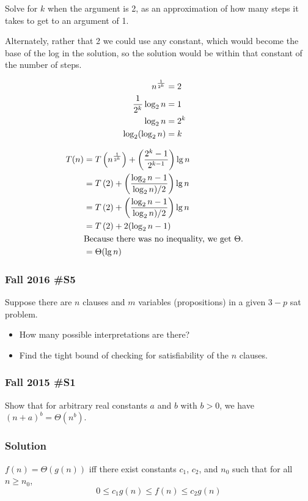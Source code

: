 \begin{enumerate}
Solve for $k$ when the argument is 2, as an approximation of how many steps it takes to get to an argument of 1.  

Alternately, rather that 2 we could use any constant, which would become the base of the log in the solution, so the solution would be within that constant of the number of steps.  

\begin{align*}
	n^\frac{1}{2^k} &= 2 \cr
	\frac{1}{2^k} \log_2 n &= 1 \cr
	\log_2 n &= 2^k \cr
	\log_2 (\log_2 n) &= k \cr
\end{align*}	

\begin{align*}
	T(n) &= T\left( n^\frac{1}{2^k} \right) +  \left( \frac{2^k - 1}{2^{k-1}}  \right) \lg n\cr
	&= T\left( 2 \right) +  \left( \frac{\log_2 n - 1}{\log_2 n)/2}  \right) \lg n\cr
	&= T\left( 2 \right) +  \left( \frac{\log_2 n - 1}{\log_2 n)/2}  \right) \lg n\cr
	&= T\left( 2 \right) +  2(\log_2 n - 1)\cr
	& \text{Because there was no inequality, we get $\Theta$.} \cr
	&= \Theta(\lg n) \cr
\end{align*}


	
\end{enumerate}
	
\subsubsection{Fall 2016 \#S5}	
	Suppose there are $n$ clauses and $m$ variables (propositions) in a given $3-p$ sat problem.
	\begin{itemize}
		\item How many possible interpretations are there?
		\item Find the tight bound of checking for satisfiability of the $n$ clauses.  
	\end{itemize}
	
\subsubsection{Fall 2015 \#S1}
	Show that for arbitrary real constants $a$ and $b$ with $b>0$, we have $(n+a)^b = \Theta(n^b)$.
	
\subsubsection{Solution}
	
$f(n) = \Theta(g(n))$ iff there exist constants $c_1$, $c_2$, and $n_0$ such that for all $n\ge n_0$, $$0 \le c_1 g(n) \le f(n) \le c_2 g(n)$$

